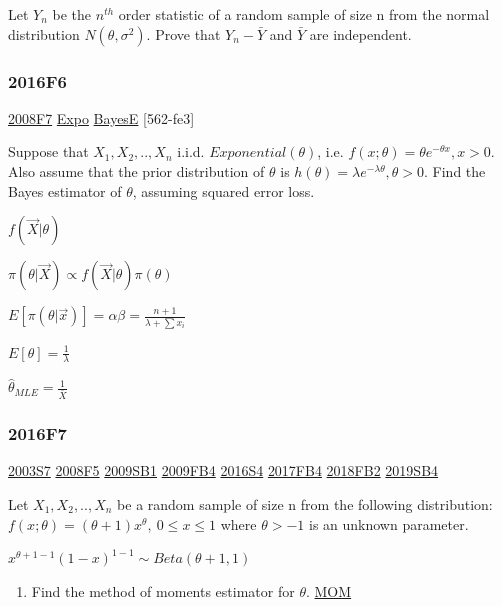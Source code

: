 \documentclass[10pt,twocolumn,portrait]{article}
\providecommand{\tightlist}{%
  \setlength{\itemsep}{0pt}\setlength{\parskip}{0pt}}
\begin{document}
Let \(Y_n\) be the \(n^{th}\) order statistic of a random sample of size
n from the normal distribution \(N(\theta,\sigma^2)\). Prove that
\(Y_n-\bar Y\) and \(\bar Y\) are independent.

\hypertarget{f6-5}{%
\subsubsection{2016F6}\label{f6-5}}

\protect\hyperlink{f7-3}{2008F7} \protect\hyperlink{Expo}{Expo}
\protect\hyperlink{BayesE}{BayesE} {[}562-fe3{]}

Suppose that \(X_1,X_2,..,X_n\) i.i.d. \(Exponential(\theta)\), i.e.
\(f(x;\theta)=\theta e^{-\theta x},x>0\). Also assume that the prior
distribution of \(\theta\) is
\(h(\theta)=\lambda e^{-\lambda\theta},\theta>0\). Find the Bayes
estimator of \(\theta\), assuming squared error loss.

\(f(\vec X|\theta)\)

\(\pi(\theta|\vec X)\propto f(\vec X|\theta)\pi(\theta)\)

\(E[\pi(\theta|\vec x)]=\alpha\beta=\frac{n+1}{\lambda+\sum x_i}\)

\(E[\theta]=\frac{1}{\lambda}\)

\(\hat\theta_{MLE}=\frac{1}{\bar X}\)

\hypertarget{f7-5}{%
\subsubsection{2016F7}\label{f7-5}}

\protect\hyperlink{s7}{2003S7} \protect\hyperlink{f5-3}{2008F5}
\protect\hyperlink{sb1}{2009SB1} \protect\hyperlink{fb4}{2009FB4}
\protect\hyperlink{s4-4}{2016S4} \protect\hyperlink{fb4-3}{2017FB4}
\protect\hyperlink{fb2-4}{2018FB2} \protect\hyperlink{sb4-2}{2019SB4}

Let \(X_1,X_2,..,X_n\) be a random sample of size n from the following
distribution: \(f(x;\theta)=(\theta+1)x^\theta,\ 0\le x\le 1\) where
\(\theta>-1\) is an unknown parameter.

\(x^{\theta+1-1}(1-x)^{1-1}\sim Beta(\theta+1,1)\)

\begin{enumerate}
\def\labelenumi{(\alph{enumi})}
\tightlist
\item
  Find the method of moments estimator for \(\theta\).
  \protect\hyperlink{section-2}{MOM}
\end{enumerate}
\end{document}
